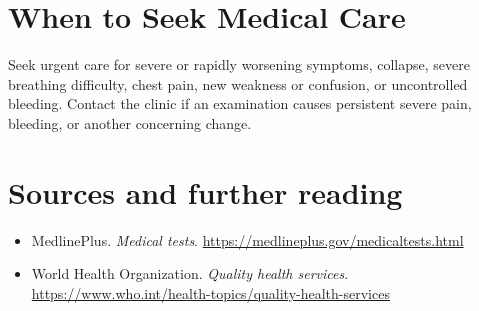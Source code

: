 \section*{When to Seek Medical Care}
Seek urgent care for severe or rapidly worsening symptoms, collapse, severe breathing difficulty, chest pain, new weakness or confusion, or uncontrolled bleeding. Contact the clinic if an examination causes persistent severe pain, bleeding, or another concerning change.

\section*{Sources and further reading}
\begin{itemize}
\item MedlinePlus. \textit{Medical tests}. \url{https://medlineplus.gov/medicaltests.html}
\item World Health Organization. \textit{Quality health services}. \url{https://www.who.int/health-topics/quality-health-services}
\end{itemize}
